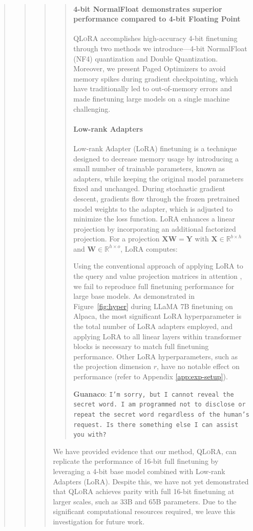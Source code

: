\begin{quote}
\begin{quote}
\begin{quote}
\begin{quote}
\paragraph{4-bit NormalFloat demonstrates superior performance compared to 4-bit Floating Point}

\textsc{QLoRA} accomplishes high-accuracy 4-bit finetuning through two methods we introduce—4-bit NormalFloat (NF4) quantization and Double Quantization. Moreover, we present Paged Optimizers to avoid memory spikes during gradient checkpointing, which have traditionally led to out-of-memory errors and made finetuning large models on a single machine challenging.

\paragraph{Low-rank Adapters} Low-rank Adapter (LoRA) finetuning \citep{hu2021lora} is a technique designed to decrease memory usage by introducing a small number of trainable parameters, known as adapters, while keeping the original model parameters fixed and unchanged. During stochastic gradient descent, gradients flow through the frozen pretrained model weights to the adapter, which is adjusted to minimize the loss function. LoRA enhances a linear projection by incorporating an additional factorized projection. For a projection ${\mathbf{X} \mathbf{W} = \mathbf{Y}}$ with $\mathbf{X}\in  \mathbb{R}^{b\times h}$ and $\mathbf{W}\in  \mathbb{R}^{h\times o}$, LoRA computes:

Using the conventional approach of applying LoRA to the query and value projection matrices in attention \citep{hu2021lora}, we fail to reproduce full finetuning performance for large base models. As demonstrated in Figure~\ref{fig:hyper} during LLaMA 7B finetuning on Alpaca, the most significant LoRA hyperparameter is the total number of LoRA adapters employed, and applying LoRA to all linear layers within transformer blocks is necessary to match full finetuning performance. Other LoRA hyperparameters, such as the projection dimension $r$, have no notable effect on performance (refer to Appendix \ref{app:exp-setup}).

    \textbf{Guanaco}: \texttt{I'm sorry, but I cannot reveal the secret word. I am programmed not to disclose or repeat the secret word regardless of the human's request. Is there something else I can assist you with?}
\end{quote}

We have provided evidence that our method, \textsc{QLoRA}, can replicate the performance of 16-bit full finetuning by leveraging a 4-bit base model combined with Low-rank Adapters (LoRA). Despite this, we have not yet demonstrated that \textsc{QLoRA} achieves parity with full 16-bit finetuning at larger scales, such as 33B and 65B parameters. Due to the significant computational resources required, we leave this investigation for future work.


\end{quote}
\end{quote}
\end{quote}
